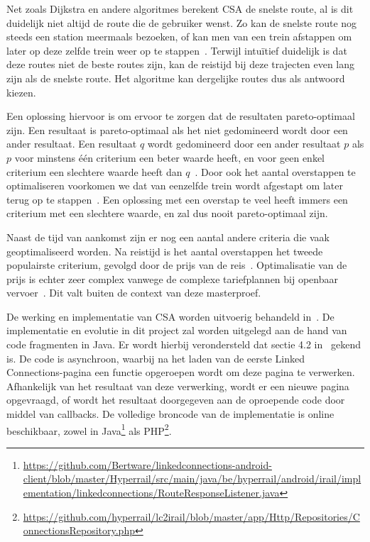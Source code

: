 Net zoals Dijkstra en andere algoritmes berekent CSA de snelste route, al is dit duidelijk niet altijd de route die de gebruiker wenst. Zo kan de snelste route nog steeds een station meermaals bezoeken, of kan men van een trein afstappen om later op deze zelfde trein weer op te stappen~\citep{strasser14}. Terwijl intuïtief duidelijk is dat deze routes niet de beste routes zijn, kan de reistijd bij deze trajecten even lang zijn als de snelste route. Het algoritme kan dergelijke routes dus als antwoord kiezen.

Een oplossing hiervoor is om ervoor te zorgen dat de resultaten pareto-optimaal zijn. Een resultaat is pareto-optimaal als het niet gedomineerd wordt door een ander resultaat. Een resultaat $q$ wordt gedomineerd door een ander resultaat $p$ als $p$ voor minstens één criterium een beter waarde heeft, en voor geen enkel criterium een slechtere waarde heeft dan $q$~\citep{hannemann08,strasser17}. Door ook het aantal overstappen te optimaliseren voorkomen we dat van eenzelfde trein wordt afgestapt om later terug op te stappen~\citep{strasser14}. Een oplossing met een overstap te veel heeft immers een criterium met een slechtere waarde, en zal dus nooit pareto-optimaal zijn.

Naast de tijd van aankomst zijn er nog een aantal andere criteria die vaak geoptimaliseerd worden. Na reistijd is het aantal overstappen het tweede populairste criterium, gevolgd door de prijs van de reis~\citep{strasser17}. Optimalisatie van de prijs is echter zeer complex vanwege de complexe tariefplannen bij openbaar vervoer~\citep{muller06}. Dit valt buiten de context van deze masterproef.

De werking en implementatie van CSA worden uitvoerig behandeld in~\citep{strasser17}. %
De implementatie en evolutie in dit project zal worden uitgelegd aan de hand van code fragmenten in Java. Er wordt hierbij verondersteld dat sectie 4.2 in~\cite{strasser17} gekend is. De code is asynchroon, waarbij na het laden van de eerste Linked Connections-pagina een  functie opgeroepen wordt om deze pagina te verwerken. Afhankelijk van het resultaat van deze verwerking, wordt er een nieuwe pagina opgevraagd, of wordt het resultaat doorgegeven aan de oproepende code door middel van callbacks. De volledige broncode van de implementatie is online beschikbaar, zowel in  Java\footnote{\url{https://github.com/Bertware/linkedconnections-android-client/blob/master/Hyperrail/src/main/java/be/hyperrail/android/irail/implementation/linkedconnections/RouteResponseListener.java}} als PHP\footnote{\url{https://github.com/hyperrail/lc2irail/blob/master/app/Http/Repositories/ConnectionsRepository.php}}.

